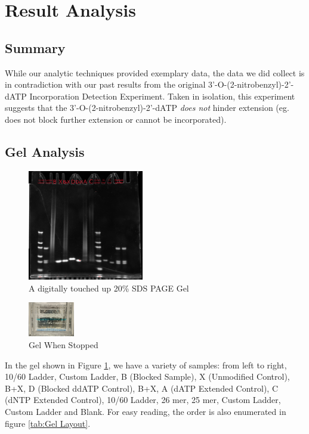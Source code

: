 \documentclass[letterpaper]{article}
\newcommand{\BdATP}{3'-O-(2-nitrobenzyl)-2'-dATP}
\begin{document}
\section{Result Analysis}
\subsection{Summary}
While our analytic techniques provided exemplary data, the data we did collect is in contradiction with our past results from the original \BdATP{} Incorporation Detection Experiment. Taken in isolation, this experiment suggests that the \BdATP{} \textit{does not} hinder extension (eg. does not block further extension or cannot be incorporated).
\subsection{Gel Analysis}

\begin{figure}[ht]
\label{mainGel}
\begin{center}
\includegraphics[width=0.45\textwidth]{./resources/gels/touched-up-gel.png}
\caption{A digitally touched up 20\% SDS PAGE Gel}
\end{center}
\end{figure}


\begin{figure}
\centering
\includegraphics[width=0.18\textwidth]{./resources/endCondition.jpg}
\caption{Gel When Stopped}
\label{endCondition}
\end{figure}


In the gel shown in Figure \ref{mainGel}, we have a variety of samples: from left to right, 10/60 Ladder, Custom Ladder, B (Blocked Sample), X (Unmodified Control), B+X, D (Blocked ddATP Control), B+X, A (dATP Extended Control), C (dNTP Extended Control), 10/60 Ladder, 26 mer, 25 mer, Custom Ladder, Custom Ladder and Blank. For easy reading, the order is also enumerated in figure \ref{tab:Gel Layout}.\\
\end{document}
